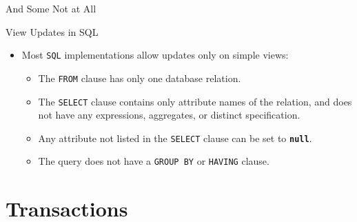 \documentclass{beamer}
\begin{document}
\begin{frame}[fragile]{And Some Not at All}
\end{frame}

\begin{frame}{View Updates in SQL}
    \begin{itemize}
        \item Most \texttt{SQL} implementations allow updates only on simple views:
        \begin{itemize}
            \item The \texttt{FROM} clause has only one database relation.
            \item The \texttt{SELECT} clause contains only attribute names of the relation, and does not have any expressions, aggregates, or distinct specification.
            \item Any attribute not listed in the \texttt{SELECT} clause can be set to \texttt{\textbf{null}}.
            \item The query does not have a \texttt{GROUP BY} or \texttt{HAVING} clause.
        \end{itemize}
    \end{itemize}
\end{frame}

\section{Transactions}
\end{document}
